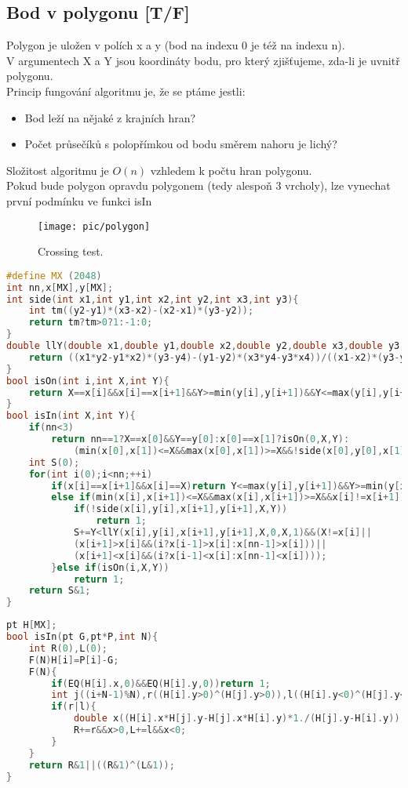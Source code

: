 \documentclass[11pt]{article}
\begin{document}
\subsection{Bod v polygonu [T/F]}
Polygon je uložen v polích \textsf{x} a \textsf{y} (bod na indexu 0 je též na indexu \textsf{n}).
\\V argumentech \textsf{X} a \textsf{Y} jsou koordináty bodu, pro který zjišťujeme, zda-li je uvnitř polygonu.
\\Princip fungování algoritmu je, že se ptáme jestli:
\begin{itemize}
\item Bod leží na nějaké z krajních hran?
\item Počet průsečíků s polopřímkou od bodu směrem nahoru je lichý?
\end{itemize}  
Složitost algoritmu je $O(n)$ vzhledem k počtu hran polygonu.
\\Pokud bude polygon opravdu polygonem (tedy alespoň 3 vrcholy), lze vynechat první podmínku ve funkci \textsf{isIn}
\begin{figure}[H]
  \centering
  \texttt{[image: pic/polygon]}
  \caption[Bod v polygonu.]{Crossing test.}
\end{figure}
\begin{lstlisting}[language=C++]
#define MX (2048)
int nn,x[MX],y[MX];
int side(int x1,int y1,int x2,int y2,int x3,int y3){
    int tm((y2-y1)*(x3-x2)-(x2-x1)*(y3-y2));
    return tm?tm>0?1:-1:0;
}
double llY(double x1,double y1,double x2,double y2,double x3,double y3,double x4,double y4){
    return ((x1*y2-y1*x2)*(y3-y4)-(y1-y2)*(x3*y4-y3*x4))/((x1-x2)*(y3-y4)-(y1-y2)*(x3-x4));
}
bool isOn(int i,int X,int Y){
    return X==x[i]&&x[i]==x[i+1]&&Y>=min(y[i],y[i+1])&&Y<=max(y[i],y[i+1]);
}
bool isIn(int X,int Y){
    if(nn<3)
        return nn==1?X==x[0]&&Y==y[0]:x[0]==x[1]?isOn(0,X,Y):
            (min(x[0],x[1])<=X&&max(x[0],x[1])>=X&&!side(x[0],y[0],x[1],y[1],X,Y));
    int S(0);
    for(int i(0);i<nn;++i)
        if(x[i]==x[i+1]&&x[i]==X)return Y<=max(y[i],y[i+1])&&Y>=min(y[i],y[i+1]);
        else if(min(x[i],x[i+1])<=X&&max(x[i],x[i+1])>=X&&x[i]!=x[i+1]){
            if(!side(x[i],y[i],x[i+1],y[i+1],X,Y))
                return 1;
            S+=Y<llY(x[i],y[i],x[i+1],y[i+1],X,0,X,1)&&(X!=x[i]||
      		(x[i+1]>x[i]&&(i?x[i-1]>x[i]:x[nn-1]>x[i]))||
      		(x[i+1]<x[i]&&(i?x[i-1]<x[i]:x[nn-1]<x[i])));
        }else if(isOn(i,X,Y))
            return 1;
    return S&1;
}
\end{lstlisting}
\begin{lstlisting}[language=C++]
pt H[MX];
bool isIn(pt G,pt*P,int N){
    int R(0),L(0);
    F(N)H[i]=P[i]-G;
    F(N){
        if(EQ(H[i].x,0)&&EQ(H[i].y,0))return 1;
        int j((i+N-1)%N),r((H[i].y>0)^(H[j].y>0)),l((H[i].y<0)^(H[j].y<0));
        if(r|l){
            double x((H[i].x*H[j].y-H[j].x*H[i].y)*1./(H[j].y-H[i].y));
            R+=r&&x>0,L+=l&&x<0;
        }
    }
    return R&1||((R&1)^(L&1));
}
\end{lstlisting}
\end{document}
